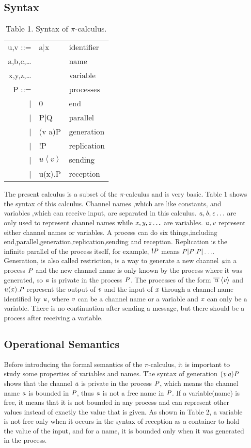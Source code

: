 \documentclass[a4paper]{article}
\begin{document}
\subsection{Syntax}
\begin{table}

\centering
\begin{tabular}{rll}
u,v ::=&a|x&identifier\\
a,b,c,\ldots&&name\\
x,y,z,\ldots&&variable\\
P ::= &&processes\\
|&0&end\\
|& P|Q&parallel\\
|&(v a)P&generation\\
|&!P&replication\\
|&$ \bar{u}\left\langle v \right\rangle$ &sending\\
|&u(x).P&reception\\

\end{tabular}
\caption{Table 1. Syntax of \(\pi\)-calculus.}
\end{table}
The present calculus is a subset of the \(\pi\)-calculus and is very basic. Table 1 shows the syntax of this calculus. Channel names ,which are like constants, and variables ,which can receive input, are separated in this calculus. $\it a,b,c \ldots$ are only used to represent channel names while $\it x,y,z\ldots$ are variables. $\it u,v$ represent either channel names or variables. A process can do six things,including end,parallel,generation,replication,sending and reception. Replication is the infinite parallel of the process itself, for example, $\it !P$ means $\it P|P|P|\ldots$. Generation, is also called restriction, is a way to generate a new channel $\it a$in a process $\it P$ and the new channel name is only known by the process where it was generated, so $\it a$ is private in the process $\it P$. The processes of the form $\it \bar{u}\left\langle v \right\rangle$ and $\it u(x).P$ represent  the output of $\it v$ and the input of $\it x$ through a channel name identified by $\it u$, where $\it v$ can be a channel name or a variable and $\it x$ can only be a variable. There is no continuation after sending a message, but  there should be a process after receiving a variable.
\subsection{Operational Semantics}
Before introducing the formal semantics of the \(\pi\)-calculus, it is important to study some properties of variables and names. The syntax of generation $\it (v\,a )P$ shows that the channel  $\it a$ is private in the process $\it P$, which means the channel name $\it a$ is bounded in $\it P$, thus $\it a$ is not a free name in $\it P$. If a variable(name) is free, it means that it is not bounded in any process and can represent other values instead of exactly the value that is given. As shown in Table 2, a variable is not free only when it occurs in the syntax of reception as a container to hold the value of the input, and for a name, it is bounded only when it was generated in the process.
\end{document}

